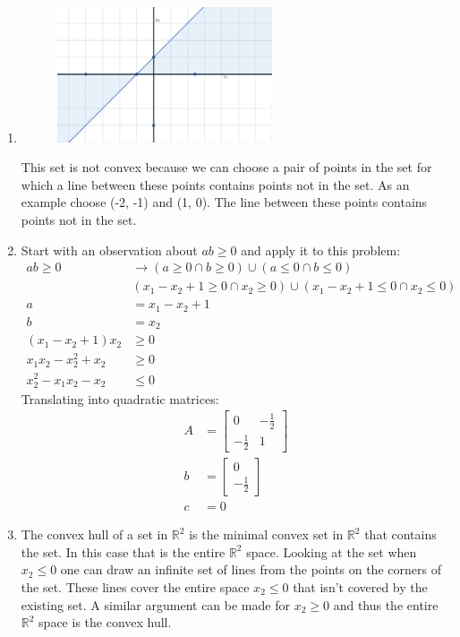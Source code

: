 \documentclass[11pt]{article}
\begin{document}
\begin{solution}
\begin{enumerate}
    \item
    \begin{figure}[H]
        \centerline{\includegraphics[width=0.6\textwidth]{problem1_set.png}}
    \end{figure}
    This set is not convex because we can choose a pair of points in the set for which a line between these points contains points not in the set. As an example choose (-2, -1) and (1, 0). The line between these points contains points not in the set.

    \item Start with an observation about $ab \geq 0$ and apply it to this problem:
    \begin{align*}
        ab \geq 0 &\rightarrow (a \geq 0 \cap b \geq 0) \cup (a \leq 0 \cap b \leq 0) \\
        &(x_1 - x_2 + 1 \geq 0 \cap x_2 \geq 0) \cup (x_1 - x_2 + 1 \leq 0 \cap x_2 \leq 0) \\
        a &= x_1 - x_2 + 1 \\
        b &= x_2 \\
        (x_1 - x_2 + 1) x_2 &\geq 0 \\
        x_1 x_2 - x_2^2 + x_2 &\geq 0 \\
        x_2^2 - x_1 x_2 - x_2 &\leq 0
    \end{align*}
    Translating into quadratic matrices:
    \begin{align*}
        A &= \begin{bmatrix} 0 & -\frac{1}{2} \\ -\frac{1}{2} & 1 \end{bmatrix} \\
        b &= \begin{bmatrix} 0 \\ -\frac{1}{2} \end{bmatrix} \\
        c &= 0
    \end{align*}

\item The convex hull of a set in $\mathbb{R}^2$ is the minimal convex set in $\mathbb{R}^2$ that contains the set. In this case that is the entire $\mathbb{R}^2$ space. Looking at the set when $x_2 \leq 0$ one can draw an infinite set of lines from the points on the corners of the set. These lines cover the entire space $x_2 \leq 0$ that isn't covered by the existing set. A similar argument can be made for $x_2 \geq 0$ and thus the entire $\mathbb{R}^2$ space is the convex hull.
\end{enumerate}
\end{solution}
\end{document}
